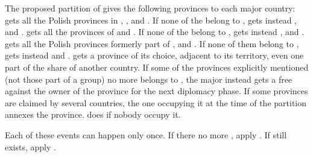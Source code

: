 \aparag The proposed partition of \payspologne gives the following provinces
to each major country:
\bparag \RUS gets all the Polish provinces in \regionUkraine,
\provinceSeveria, \provinceBaltarusija and \provincePolacak. If none of the
belong to \payspologne, \RUS gets instead \provinceLietuva, \provinceZemaitija
and \provincePrypec.
\bparag \PRU gets all the provinces of  and
. If none of the belong to \payspologne, \PRU gets
instead \provinceDanzig, \provinceWielkopolska and \provinceMazowia.
\bparag \AUS gets all the Polish provinces formerly part of \payshongrie,
\provinceMorava and \provinceMalopolska. If none of them belong to
\payspologne, \AUS gets instead \provinceWolyn and \provinceLublin.
\bparag \SUE gets a province of its choice, adjacent to its territory, even
one part of the share of another country.
\aparag If some of the provinces explicitly mentioned (not those part of a
group) no more belongs to \payspologne, the major instead gets a free \CB
against the owner of the province for the next diplomacy phase.
\aparag If some provinces are claimed by several countries, the one occupying
it at the time of the partition annexes the province. \SUE does if nobody
occupy it.





\aparag Each of these events can happen only once.
\bparag If there no more \payspologne, apply .
\bparag If \payspologne still exists, apply .



